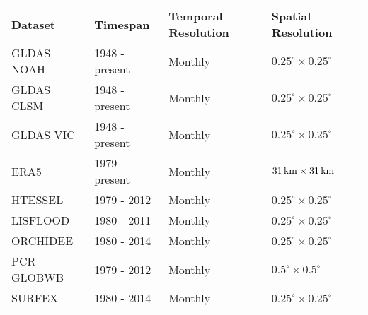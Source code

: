 \begin{table}[htbp]\centering
	\begin{tabular}{llll}
		&                                     &                                          &                                                                                \\ \hline
		\multicolumn{1}{|l|}{\textbf{Dataset}}    & \multicolumn{1}{l|}{\textbf{Timespan}}       & \multicolumn{1}{l|}{\textbf{Temporal Resolution}} & \multicolumn{1}{l|}{\textbf{Spatial Resolution}}  \\ \hline
		\multicolumn{1}{|l|}{GLDAS NOAH} & \multicolumn{1}{l|}{1948 - present} & \multicolumn{1}{l|}{Monthly}             & \multicolumn{1}{l|}{$0.25^{\circ} \times  0.25^{\circ}$}             \\ \hline
		\multicolumn{1}{|l|}{GLDAS CLSM} & \multicolumn{1}{l|}{1948 - present} & \multicolumn{1}{l|}{Monthly}             & \multicolumn{1}{l|}{$0.25^{\circ} \times 0.25^{\circ}$}             \\ \hline
		\multicolumn{1}{|l|}{GLDAS VIC}  & \multicolumn{1}{l|}{1948 - present} & \multicolumn{1}{l|}{Monthly}             & \multicolumn{1}{l|}{$0.25^{\circ} \times 0.25^{\circ}$}              \\   \hline
		\multicolumn{1}{|l|}{ERA5}       & \multicolumn{1}{l|}{1979 - present} & \multicolumn{1}{l|}{Monthly}             & \multicolumn{1}{l|}{$31\,\mathrm{km} \times 31\,\mathrm{km}$}                      \\ \hline
		\multicolumn{1}{|l|}{HTESSEL}       & \multicolumn{1}{l|}{1979 - 2012} & \multicolumn{1}{l|}{Monthly}             & \multicolumn{1}{l|}{$0.25^{\circ} \times 0.25^{\circ}$}                     \\ \hline
		\multicolumn{1}{|l|}{LISFLOOD}       & \multicolumn{1}{l|}{1980 - 2011} & \multicolumn{1}{l|}{Monthly}             & \multicolumn{1}{l|}{$0.25^{\circ} \times 0.25^{\circ}$}                    \\ \hline
		\multicolumn{1}{|l|}{ORCHIDEE}       & \multicolumn{1}{l|}{1980 - 2014} & \multicolumn{1}{l|}{Monthly}             & \multicolumn{1}{l|}{$0.25^{\circ} \times 0.25^{\circ}$}                      \\ \hline
		\multicolumn{1}{|l|}{PCR-GLOBWB}       & \multicolumn{1}{l|}{1979 - 2012} & \multicolumn{1}{l|}{Monthly}             & \multicolumn{1}{l|}{$0.5^{\circ} \times 0.5^{\circ}$}                      \\ \hline
		\multicolumn{1}{|l|}{SURFEX}       & \multicolumn{1}{l|}{1980 - 2014} & \multicolumn{1}{l|}{Monthly}             & \multicolumn{1}{l|}{$0.25^{\circ} \times 0.25^{\circ}$}                     \\ \hline

\end{tabular}
\end{table}
